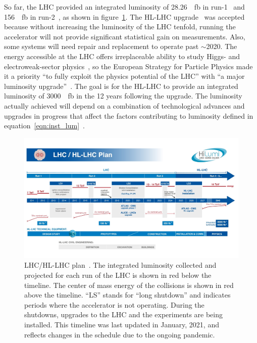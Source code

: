 So far, the LHC provided an integrated luminosity of \SI{28.26}{\per\femto\barn} in run-1~\cite{atlas_luminosity_run1} and \SI{156}{\per\femto\barn} in run-2~\cite{atlas_luminosity_run2}, as shown in figure~\ref{fig:hl-lhc}. The HL-LHC upgrade~\cite{hl_lhc_tdr} was accepted because without increasing the luminosity of the LHC tenfold, running the accelerator will not provide significant statistical gain on measurements. Also, some systems will need repair and replacement to operate past $\sim$2020. The energy accessible at the LHC offers irreplaceable ability to study Higgs- and electroweak-sector physics~\cite{dainese_physics_2018}, so the European Strategy for Particle Physics made it a priority ``to fully exploit the physics potential of the LHC'' with ``a major luminosity upgrade''~\cite{european_strategy_for_particle_physics}. The goal is for the HL-LHC to provide an integrated luminosity of \SI{3000}{\per\femto\barn} in the 12 years following the upgrade. The luminosity actually achieved will depend on a combination of technological advances and upgrades in progress that affect the factors contributing to luminosity defined in equation~\ref{eqn:inst_lum}~\cite{hl_lhc_tdr}.


\begin{figure}
    \centering
    \includegraphics[width = \textwidth]{figures/HL-LHC-updated-January-2021_small.jpg}
    \caption{LHC/HL-LHC plan~\cite{hl-lhc_plan_picture_website}. The integrated luminosity collected and projected for each run of the LHC is shown in red below the timeline. The center of mass energy of the collisions is shown in red above the timeline. ``LS'' stands for ``long shutdown'' and indicates periods where the accelerator is not operating. During the shutdowns, upgrades to the LHC and the experiments are being installed. This timeline was last updated in January, 2021, and reflects changes in the schedule due to the ongoing pandemic. }
    \label{fig:hl-lhc}
\end{figure}

